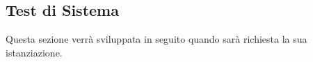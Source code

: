 \subsection{Test di Sistema}
Questa sezione verrà sviluppata in seguito quando sarà richiesta la sua istanziazione.
